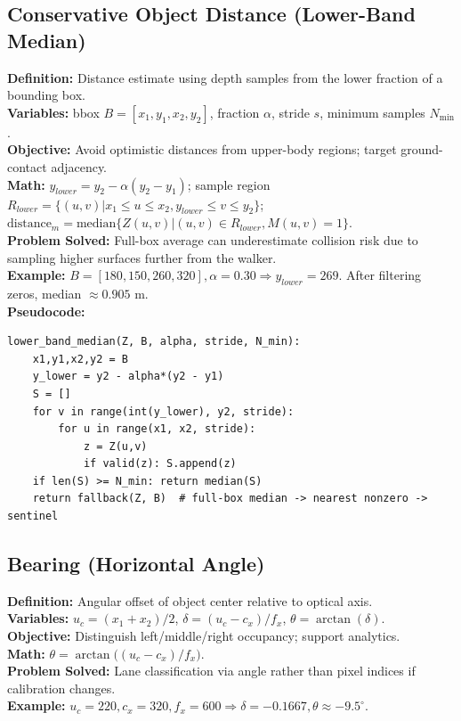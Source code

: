 \documentclass[11pt,a4paper]{article}
\begin{document}
\subsection{Conservative Object Distance (Lower-Band Median)}
\textbf{Definition:} Distance estimate using depth samples from the lower fraction of a bounding box.\\
\textbf{Variables:} bbox $B=[x_1,y_1,x_2,y_2]$, fraction $\alpha$, stride $s$, minimum samples $N_{\min}$.\\
\textbf{Objective:} Avoid optimistic distances from upper-body regions; target ground-contact adjacency.\\
\textbf{Math:} $y_{lower} = y_2 - \alpha (y_2 - y_1)$; sample region $R_{lower}=\{(u,v)|x_1\le u\le x_2, y_{lower}\le v\le y_2\}$; $\text{distance}_m=\mathrm{median}\{Z(u,v)| (u,v)\in R_{lower}, M(u,v)=1\}$.\\
\textbf{Problem Solved:} Full-box average can underestimate collision risk due to sampling higher surfaces further from the walker.\\
\textbf{Example:} $B=[180,150,260,320], \alpha=0.30 \Rightarrow y_{lower}=269$. After filtering zeros, median $\approx0.905$ m.\\
\textbf{Pseudocode:}
\begin{lstlisting}[style=code]
lower_band_median(Z, B, alpha, stride, N_min):
    x1,y1,x2,y2 = B
    y_lower = y2 - alpha*(y2 - y1)
    S = []
    for v in range(int(y_lower), y2, stride):
        for u in range(x1, x2, stride):
            z = Z(u,v)
            if valid(z): S.append(z)
    if len(S) >= N_min: return median(S)
    return fallback(Z, B)  # full-box median -> nearest nonzero -> sentinel
\end{lstlisting}

\subsection{Bearing (Horizontal Angle)}
\textbf{Definition:} Angular offset of object center relative to optical axis.\\
\textbf{Variables:} $u_c = (x_1+x_2)/2$, $\delta=(u_c-c_x)/f_x$, $\theta=\arctan(\delta)$.\\
\textbf{Objective:} Distinguish left/middle/right occupancy; support analytics.\\
\textbf{Math:} $\theta = \arctan\big((u_c-c_x)/f_x\big)$.\\
\textbf{Problem Solved:} Lane classification via angle rather than pixel indices if calibration changes.\\
\textbf{Example:} $u_c=220,c_x=320,f_x=600\Rightarrow\delta=-0.1667,\theta\approx -9.5^\circ$.\\
\end{document}
